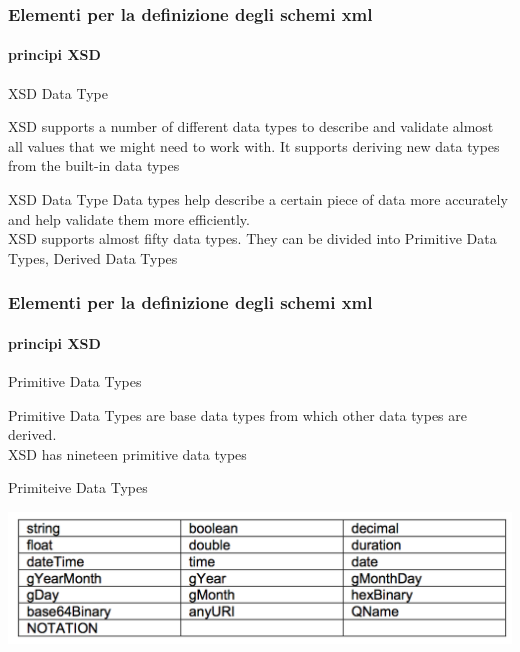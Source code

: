 \begin{frame}
	\frametitle{Elementi per la definizione degli schemi xml}
	\framesubtitle{principi XSD}
	\addtocounter{nframe}{1}

	\begin{block}{XSD Data Type}


		XSD supports a number of different data types to describe and validate almost all values that we might need to work with.
		It supports deriving new data types from the built-in data types


	\end{block}

	\begin{block}{XSD Data Type}
		Data types help describe a certain piece of data more accurately and help validate them more efficiently.
		\\ XSD supports almost fifty data types. They can be divided into Primitive Data Types, Derived Data Types

	\end{block}



\end{frame}

\begin{frame}
	\frametitle{Elementi per la definizione degli schemi xml}
	\framesubtitle{principi XSD}
	\addtocounter{nframe}{1}

	\begin{block}{Primitive Data Types}

		Primitive Data Types are base data types from which other data types are derived.
		\\XSD has nineteen primitive data types

	\end{block}

	\begin{block}{Primiteive Data Types}

		\includegraphics[width=.95\textwidth]{imgs/TabellaDataTypeXSD.png}

	\end{block}

\end{frame}

